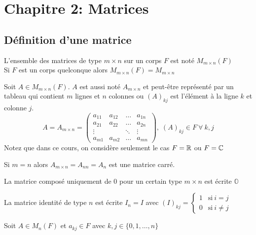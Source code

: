 \section{Chapitre 2: Matrices}

\subsection{Définition d'une matrice}
\begin{definition}
    L'ensemble des matrices de type $m \times n$ sur un corps $F$ est noté $M_{m \times n}(F)$ \\
    Si $F$ est un corps quelconque alors $M_{m \times n}(F) = M_{m \times n}$
\end{definition}
\begin{definition}
    Soit $A \in M_{m \times n}(F)$. $A$ est aussi noté $A_{m \times n}$ et peut-être représenté
    par un tableau qui contient $m$ lignes et $n$ colonnes ou $\left(A\right)_{kj}$ est l'élément
    à la ligne $k$ et colonne $j$. \[
        A = A_{m \times n} = \begin{pmatrix}
            a_{11} & a_{12}      & \dots  & a_{1n} \\
            a_{21} & a_{22}      & \dots  & a_{2n} \\
            \vdots & \phantom{a} & \ddots & \vdots \\
            a_{m1} & a_{m2}      & \dots  & a_{mn}
        \end{pmatrix}, \; \left(A\right)_{kj} \in F \ \forall \ k, j
    \]
    Notez que dans ce cours, on considère seulement le cas $F = \mathbb{R}$ ou $F = \mathbb{C}$
\end{definition}
\begin{definition}
    Si $m = n$ alors $A_{m \times n} = A_{nn} = A_n$ est une matrice carré.
\end{definition}
\begin{definition}
    La matrice composé uniquement de 0 pour un certain type $m \times n$ est écrite $\mathbb{O}$
\end{definition}
\begin{definition}
    La matrice identité de type $n$ est écrite $I_n = I$ avec $(I)_{kj} = \begin{cases}
            1 & \text{si} \ i = j    \\
            0 & \text{si} \ i \neq j
        \end{cases}$
\end{definition}
Soit $A \in M_n(F)$ et $a_{kj} \in F$ avec $k, j \in \{0, 1, \dots, n\}$
